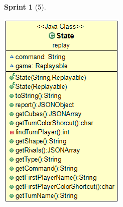 \documentclass[12pt,a4paper,openright]{book}
\theoremstyle{break}
\newtheorem*{sprint}{Sprint}
\begin{document}
\begin{sprint}[5]
\begin{center}
\includegraphics[scale=0.5]{state-sprint5.png}
\end{center}

\end{sprint}
\end{document}
